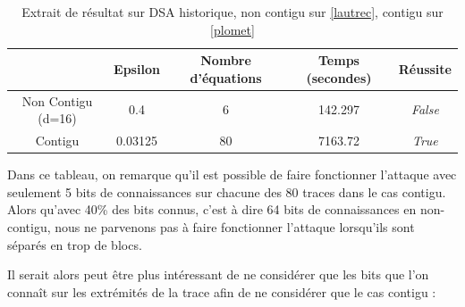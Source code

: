 \documentclass{backend}
\begin{document}
\begin{center}
    \begin{table}[H]
        \centering
        \caption{Extrait de résultat sur DSA historique, non contigu sur \ref{lautrec}, contigu sur \ref{plomet}}
        \label{tab:echec_non_contigu}
        \begin{tabular}{|c|c|c|c|c|}
            \toprule
            & Epsilon & Nombre d'équations & Temps (secondes) & Réussite \\
            \midrule
             Non Contigu (d=16) \label{tab:obsrv1} &  0.4     & 6  & 142.297 & \textit{False} \\
             Contigu \label{tab:obsrv2}    &  0.03125 & 80 & 7163.72 & \textit{True} \\
            \bottomrule
        \end{tabular}
    \end{table}
\end{center}

Dans ce tableau, on remarque qu'il est possible de faire fonctionner l'attaque avec seulement 5 bits de connaissances sur chacune des 80 traces dans le cas contigu. Alors qu'avec 40\% des bits connus, c'est à dire 64 bits de connaissances en non-contigu, nous ne parvenons pas à faire fonctionner l'attaque lorsqu'ils sont séparés en trop de blocs.

\medbreak

Il serait alors peut être plus intéressant de ne considérer que les bits que l'on connaît sur les extrémités de la trace afin de ne considérer que le cas contigu :

\medbreak
\begin{center}
    \smallbreak
    \smallbreak
\end{center}
\end{document}
